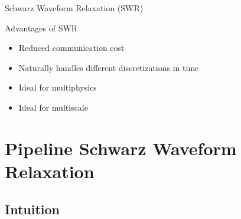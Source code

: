 \documentclass[]{beamer}
\begin{document}
\begin{frame}{Schwarz Waveform Relaxation (SWR)}

  Advantages of SWR
  \begin{itemize}
  \item Reduced communication cost
  \item Naturally handles different discretizations in time
  \item Ideal for multiphysics
  \item Ideal for multiscale
  \end{itemize}

\end{frame}



\section{Pipeline Schwarz Waveform Relaxation}

\subsection{Intuition}
\end{document}
